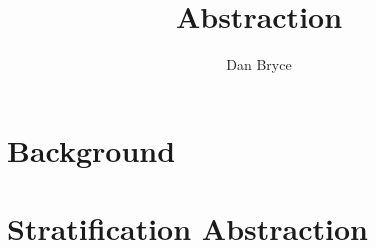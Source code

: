 \documentclass[10pt]{article}
\title{\funman Abstraction}
\author{Dan Bryce}
\newcommand{\region}{\bf X}
\newcommand{\posregion}{{\region}^+}
\newcommand{\negregion}{{\region}^-}
\newcommand{\irrelevantregion}{{\region}^\oslash}
\newcommand{\point}{{\bf x}}
\newcommand{\model}{{\bf M}}
\newcommand{\query}{{\bf Q}}
\newcommand{\reals}{{\mathbb{R}}}
\begin{document}
\maketitle

\section{Background}



\section{Stratification Abstraction}








\end{document}
